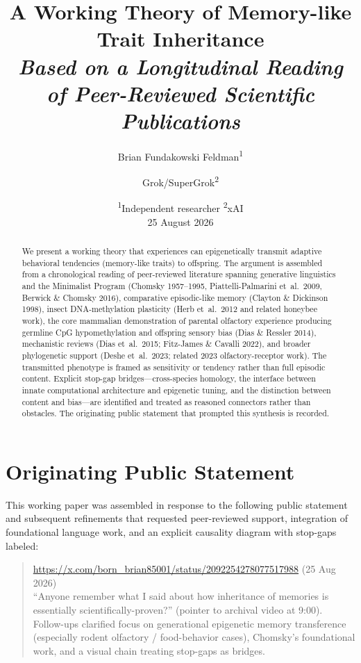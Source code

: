 \documentclass[11pt,a4paper]{article}
\title{\textbf{\color{navy}A Working Theory of Memory-like Trait Inheritance}\\[0.4em]
\large\textit{Based on a Longitudinal Reading of Peer-Reviewed Scientific Publications}}
\author{Brian Fundakowski Feldman\textsuperscript{1} \and Grok/SuperGrok\textsuperscript{2}}
\date{\small\textsuperscript{1}Independent researcher \quad\textsuperscript{2}xAI\\[0.6em]
25 August 2026}
\begin{document}
\maketitle

\begin{abstract}
\noindent
We present a working theory that experiences can epigenetically transmit adaptive behavioral tendencies (memory-like traits) to offspring. The argument is assembled from a chronological reading of peer-reviewed literature spanning generative linguistics and the Minimalist Program (Chomsky 1957--1995, Piattelli-Palmarini et~al.\ 2009, Berwick \& Chomsky 2016), comparative episodic-like memory (Clayton \& Dickinson 1998), insect DNA-methylation plasticity (Herb et~al.\ 2012 and related honeybee work), the core mammalian demonstration of parental olfactory experience producing germline CpG hypomethylation and offspring sensory bias (Dias \& Ressler 2014), mechanistic reviews (Dias et~al.\ 2015; Fitz-James \& Cavalli 2022), and broader phylogenetic support (Deshe et~al.\ 2023; related 2023 olfactory-receptor work). The transmitted phenotype is framed as sensitivity or tendency rather than full episodic content. Explicit stop-gap bridges---cross-species homology, the interface between innate computational architecture and epigenetic tuning, and the distinction between content and bias---are identified and treated as reasoned connectors rather than obstacles. The originating public statement that prompted this synthesis is recorded.
\end{abstract}

\section{Originating Public Statement}
This working paper was assembled in response to the following public statement and subsequent refinements that requested peer-reviewed support, integration of foundational language work, and an explicit causality diagram with stop-gaps labeled:

\begin{quote}
\small
\url{https://x.com/born_brian85001/status/2092254278077517988} \quad (25 Aug 2026)\\[0.3em]
``Anyone remember what I said about how inheritance of memories is essentially scientifically-proven?'' (pointer to archival video at 9:00). Follow-ups clarified focus on generational epigenetic memory transference (especially rodent olfactory / food-behavior cases), Chomsky's foundational work, and a visual chain treating stop-gaps as bridges.
\end{quote}
\end{document}
